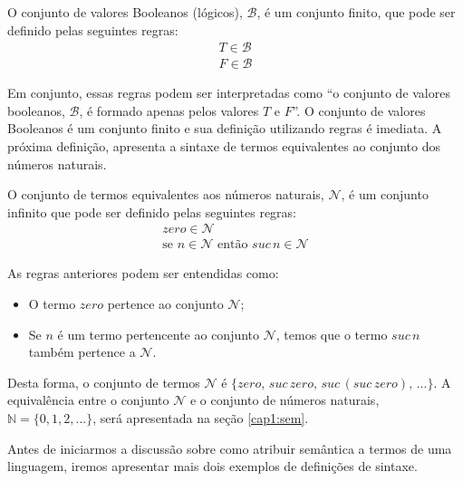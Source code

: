 \begin{Definition}
  O conjunto de valores Booleanos (l\'ogicos), $\mathcal{B}$, \'e um conjunto finito, que pode ser definido pelas seguintes regras:
  \[
      \begin{array}{l}
        T \in\mathcal{B}\\
        F \in\mathcal{B}
      \end{array}
  \]
\end{Definition}

Em conjunto, essas regras podem ser interpretadas como ``o conjunto de valores booleanos, $\mathcal{B}$, \'e formado apenas pelos valores 
$T$ e $F$''.
O conjunto de valores Booleanos \'e um conjunto finito e sua defini\c{c}\~ao utilizando regras \'e imediata. A pr\'oxima defini\c{c}\~ao,
apresenta a sintaxe de termos equivalentes ao conjunto dos n\'umeros naturais.

\begin{Definition}
O conjunto de termos equivalentes aos n\'umeros naturais, $\mathcal{N}$, \'e um conjunto infinito que pode ser definido pelas seguintes regras:
\[
   \begin{array}{l}
     zero \in \mathcal{N}\\
     \text{se }n \in \mathcal{N} \text{ ent\~ao }suc\,n\in\mathcal{N}
   \end{array}
\]
\end{Definition}

As regras anteriores podem ser entendidas como:
\begin{itemize}
  \item O termo $zero$ pertence ao conjunto $\mathcal{N}$;
  \item Se $n$ \'e um termo pertencente ao conjunto $\mathcal{N}$, temos que o termo $suc\,n$ tamb\'em pertence a $\mathcal{N}$.
\end{itemize}
Desta forma, o conjunto de termos $\mathcal{N}$ \'e $\{zero,\,suc\,zero,\,suc\,(suc\,zero),\,...\}$. 
A equival\^encia entre o conjunto $\mathcal{N}$ e o conjunto de n\'umeros naturais, $\mathbb{N} = \{0,1,2,...\}$, 
ser\'a apresentada na se\c{c}\~ao \ref{cap1:sem}.

Antes de iniciarmos a discuss\~ao sobre como atribuir sem\^antica a termos de uma linguagem, iremos apresentar mais dois exemplos de 
defini\c{c}\~oes de sintaxe.

